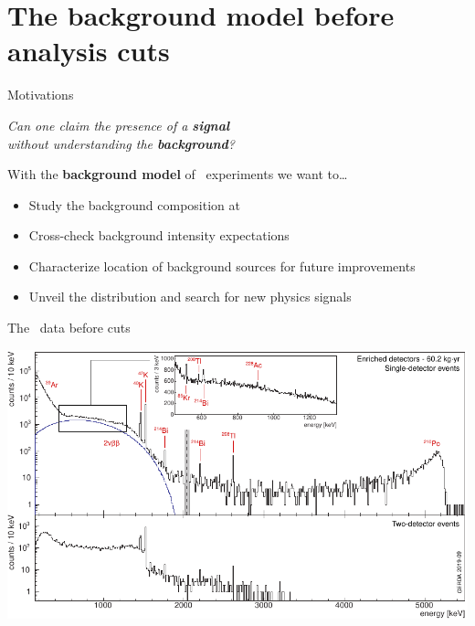\documentclass[10pt,aspectratio=169]{beamer}
\begin{document}
\section{The background model before analysis cuts}
\begin{frame}{Motivations}
  \begin{simpleblock}\centering\itshape
    Can one claim the presence of a \textbf{signal} \\
    without understanding the \textbf{background}?
  \end{simpleblock}

  \vspace*{10pt}
  With the \textbf{background model} of \onbb\ experiments we want to\ldots
  \begin{itemize}
    \item Study the background composition at \alert{\qbb}
    \item Cross-check background \alert{intensity expectations}
    \item Characterize \alert{location} of background sources for future improvements
    \item Unveil the \alert{\nnbb} distribution and search for new physics signals
  \end{itemize}
\end{frame}
\begin{frame}[plain]{The \gerda\ data before cuts}
  \begin{center}
    \includegraphics[height=0.95\textheight]{plots/bkg/raw/ph2/dataGe-desc.pdf}
  \end{center}
\end{frame}
\end{document}

